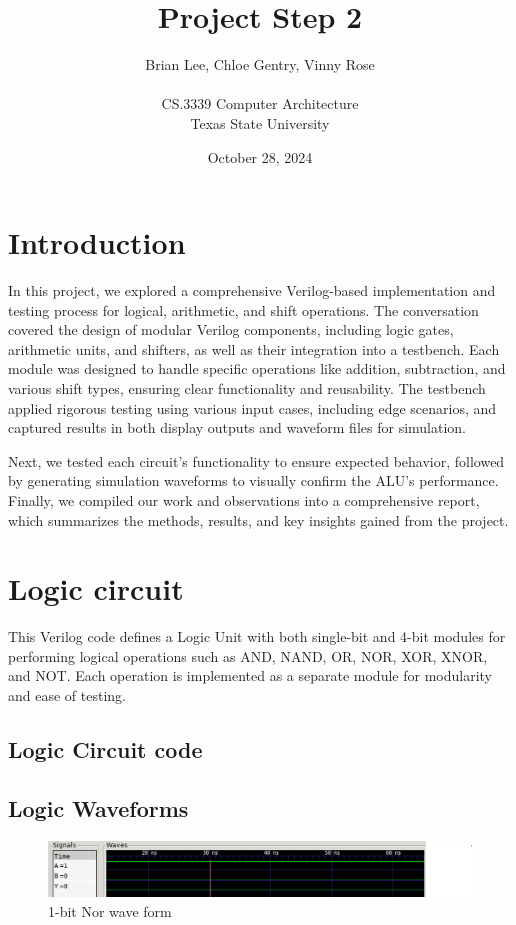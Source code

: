 \documentclass[12pt]{article}
\title{Project Step 2}
\author{Brian Lee, Chloe Gentry, Vinny Rose\\
\AND\\
\AND
\AND
\AND
\AND
	CS.3339 Computer Architecture\\
\AND
	Texas State University\\
}
\date{October 28, 2024}
\begin{document}
\maketitle

\newpage
\tableofcontents
\thispagestyle{empty}


\newpage
\setcounter{page}{1}
\section{Introduction}
In this project, we explored a comprehensive Verilog-based implementation and testing process for logical, arithmetic, and shift operations. The conversation covered the design of modular Verilog components, including logic gates, arithmetic units, and shifters, as well as their integration into a testbench. Each module was designed to handle specific operations like addition, subtraction, and various shift types, ensuring clear functionality and reusability. The testbench applied rigorous testing using various input cases, including edge scenarios, and captured results in both display outputs and waveform files for simulation.

Next, we tested each circuit's functionality to ensure expected behavior, followed by generating simulation waveforms to visually confirm the ALU’s performance. Finally, we compiled our work and observations into a comprehensive report, which summarizes the methods, results, and key insights gained from the project.


\section{Logic circuit}
This Verilog code defines a Logic Unit with both single-bit and 4-bit modules for performing logical operations such as AND, NAND, OR, NOR, XOR, XNOR, and NOT. Each operation is implemented as a separate module for modularity and ease of testing.
\subsection{Logic Circuit code}


\subsection{Logic Waveforms}
\begin{figure}[H]
    \centering 
   \includegraphics[width = 1.0\textwidth]{pictures/1bitNor.PNG}
    \caption{1-bit Nor wave form}
    \label{fig:enter-label}
    \end{figure}
\end{document}
